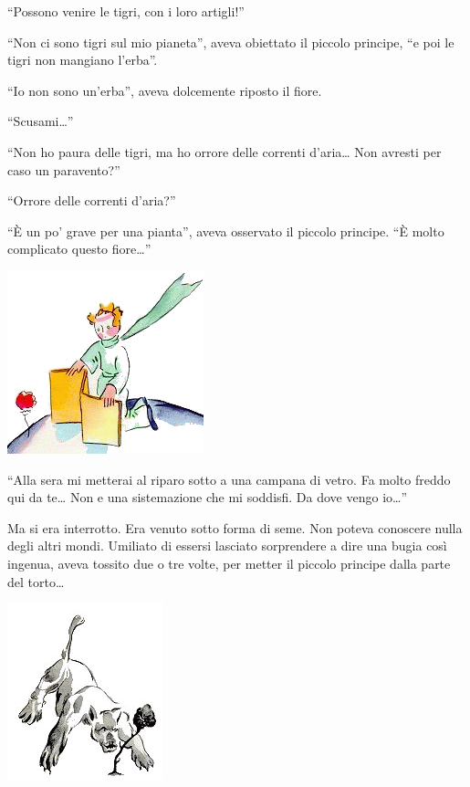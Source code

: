 \documentclass[11pt]{scrbook}
\begin{document}
``Possono venire le tigri, con i loro artigli!''

``Non ci sono tigri sul mio pianeta'', aveva obiettato il piccolo
principe, ``e poi le tigri non mangiano l'erba''.

``Io non sono un'erba'', aveva dolcemente riposto il fiore.

``Scusami\ldots{}''

``Non ho paura delle tigri, ma ho orrore delle correnti d'aria\ldots{}
Non avresti per caso un paravento?''

``Orrore delle correnti d'aria?''

``È un po' grave per una pianta'', aveva osservato il piccolo principe.
``È molto complicato questo fiore\ldots{}''

\begin{center}
\includegraphics{img/8c}
\end{center}

``Alla sera mi metterai al riparo sotto a una campana di vetro. Fa molto
freddo qui da te\ldots{} Non e una sistemazione che mi soddisfi. Da dove
vengo io\ldots{}''

Ma si era interrotto. Era venuto sotto forma di seme. Non poteva
conoscere nulla degli altri mondi. Umiliato di essersi lasciato
sorprendere a dire una bugia così ingenua, aveva tossito due o tre
volte, per metter il piccolo principe dalla parte del torto\ldots{}

\begin{center}
\includegraphics{img/8d}
\end{center}
\end{document}
